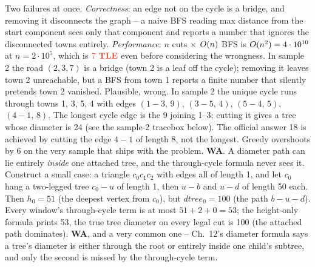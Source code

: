 \begin{thinkbox}
{Two failures at once.  \emph{Correctness}: an edge not on the cycle is a bridge,
and removing it disconnects the graph -- a naive BFS reading max distance from
the start component sees only that component and reports a number that ignores
the disconnected towns entirely.  \emph{Performance}: \(n\) cuts \(\times\) \(O(n)\)
BFS is \(O(n^2)=4\cdot 10^{10}\) at \(n=2\cdot 10^{5}\), which is \(\tle\) even
before considering the wrongness.  In sample 2 the road \((2,3,7)\) is a bridge
(town 2 is a leaf off the cycle); removing it leaves town 2 unreachable, but a
BFS from town 1 reports a finite number that silently pretends town 2 vanished.}
{Plausible, wrong.  In sample 2 the unique cycle runs through towns 1, 3, 5, 4
with edges \((1\!-\!3,\,9)\), \((3\!-\!5,\,4)\), \((5\!-\!4,\,5)\), \((4\!-\!1,\,8)\).
The longest cycle edge is the 9 joining 1--3; cutting it gives a tree whose
diameter is 24 (see the sample-2 tracebox below).  The official answer 18 is
achieved by cutting the edge \(4\!-\!1\) of length 8, not the longest.  Greedy
overshoots by 6 on the very sample that ships with the problem.  \textbf{WA}.}
{A diameter path can lie entirely \emph{inside} one attached tree, and the
through-cycle formula never sees it.  Construct a small case: a triangle
\(c_0c_1c_2\) with edges all of length 1, and let \(c_0\) hang a two-legged tree
\(c_0\!-\!u\) of length 1, then \(u\!-\!b\) and \(u\!-\!d\) of length 50 each.  Then
\(h_0{=}51\) (the deepest vertex from \(c_0\)), but \(\mathit{dtree}_0{=}100\) (the
path \(b\!-\!u\!-\!d\)).  Every window's through-cycle term is at most
\(51+2+0{=}53\); the height-only formula prints 53, the true tree diameter on
every legal cut is 100 (the attached path dominates).  \textbf{WA}, and a very
common one -- Ch.~12's diameter formula says a tree's diameter is either
through the root or entirely inside one child's subtree, and only the second
is missed by the through-cycle term.}
\end{thinkbox}
